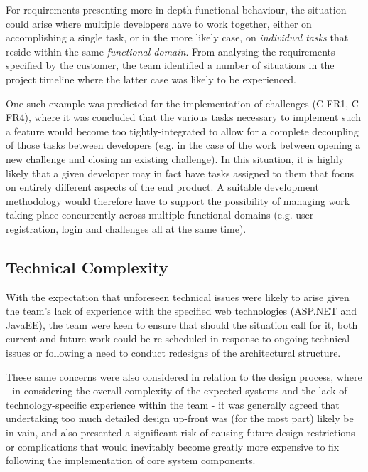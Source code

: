 For requirements presenting more in-depth functional behaviour, the situation could arise where multiple developers have to work together, either on accomplishing a single task, or in the more likely case, on \textit{individual tasks} that reside within the same \textit{functional domain}. From analysing the requirements specified by the customer, the team identified a number of situations in the project timeline where the latter case was likely to be experienced. 

One such example was predicted for the implementation of challenges (C-FR1, C-FR4), where it was concluded that the various tasks necessary to implement such a feature would become too tightly-integrated to allow for a complete decoupling of those tasks between developers (e.g. in the case of the work between opening a new challenge and closing an existing challenge). In this situation, it is highly likely that a given developer may in fact have tasks assigned to them that focus on entirely different aspects of the end product. A suitable development methodology would therefore have to support the possibility of managing work taking place concurrently across multiple functional domains (e.g. user registration, login and challenges all at the same time).

\subsection{Technical Complexity}

 With the expectation that unforeseen technical issues were likely to arise given the team's lack of experience   with the specified web technologies (ASP.NET and JavaEE), the team were keen to ensure that should the situation call for it, both current and future work could be re-scheduled in response to ongoing technical issues or following a need to conduct redesigns of the architectural structure. 
 
These same concerns were also considered in relation to the design process, where - in considering the overall complexity of the expected systems and the lack of technology-specific experience within the team - it was generally agreed that undertaking too much detailed design up-front was (for the most part) likely be in vain, and also presented a significant risk of causing future design restrictions or complications that would inevitably become greatly more expensive to fix following the implementation of core system components.

